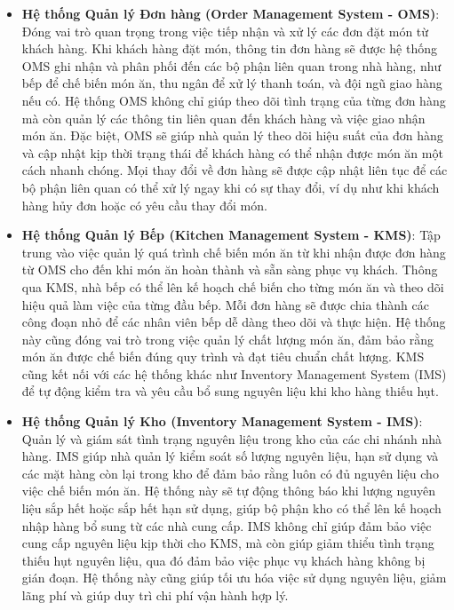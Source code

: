 \begin{itemize}
	\item \textbf{Hệ thống Quản lý Đơn hàng (Order Management System - OMS)}: Đóng vai trò quan trọng trong việc tiếp nhận và xử lý các đơn đặt món từ khách hàng. Khi khách hàng đặt món, thông tin đơn hàng sẽ được hệ thống OMS ghi nhận và phân phối đến các bộ phận liên quan trong nhà hàng, như bếp để chế biến món ăn, thu ngân để xử lý thanh toán, và đội ngũ giao hàng nếu có. Hệ thống OMS không chỉ giúp theo dõi tình trạng của từng đơn hàng mà còn quản lý các thông tin liên quan đến khách hàng và việc giao nhận món ăn. Đặc biệt, OMS sẽ giúp nhà quản lý theo dõi hiệu suất của đơn hàng và cập nhật kịp thời trạng thái để khách hàng có thể nhận được món ăn một cách nhanh chóng. Mọi thay đổi về đơn hàng sẽ được cập nhật liên tục để các bộ phận liên quan có thể xử lý ngay khi có sự thay đổi, ví dụ như khi khách hàng hủy đơn hoặc có yêu cầu thay đổi món.

	\item \textbf{Hệ thống Quản lý Bếp (Kitchen Management System - KMS)}: Tập trung vào việc quản lý quá trình chế biến món ăn từ khi nhận được đơn hàng từ OMS cho đến khi món ăn hoàn thành và sẵn sàng phục vụ khách. Thông qua KMS, nhà bếp có thể lên kế hoạch chế biến cho từng món ăn và theo dõi hiệu quả làm việc của từng đầu bếp. Mỗi đơn hàng sẽ được chia thành các công đoạn nhỏ để các nhân viên bếp dễ dàng theo dõi và thực hiện. Hệ thống này cũng đóng vai trò trong việc quản lý chất lượng món ăn, đảm bảo rằng món ăn được chế biến đúng quy trình và đạt tiêu chuẩn chất lượng. KMS cũng kết nối với các hệ thống khác như Inventory Management System (IMS) để tự động kiểm tra và yêu cầu bổ sung nguyên liệu khi kho hàng thiếu hụt.

	\item \textbf{Hệ thống Quản lý Kho (Inventory Management System - IMS)}: Quản lý và giám sát tình trạng nguyên liệu trong kho của các chi nhánh nhà hàng. IMS giúp nhà quản lý kiểm soát số lượng nguyên liệu, hạn sử dụng và các mặt hàng còn lại trong kho để đảm bảo rằng luôn có đủ nguyên liệu cho việc chế biến món ăn. Hệ thống này sẽ tự động thông báo khi lượng nguyên liệu sắp hết hoặc sắp hết hạn sử dụng, giúp bộ phận kho có thể lên kế hoạch nhập hàng bổ sung từ các nhà cung cấp. IMS không chỉ giúp đảm bảo việc cung cấp nguyên liệu kịp thời cho KMS, mà còn giúp giảm thiểu tình trạng thiếu hụt nguyên liệu, qua đó đảm bảo việc phục vụ khách hàng không bị gián đoạn. Hệ thống này cũng giúp tối ưu hóa việc sử dụng nguyên liệu, giảm lãng phí và giúp duy trì chi phí vận hành hợp lý.


\end{itemize}
